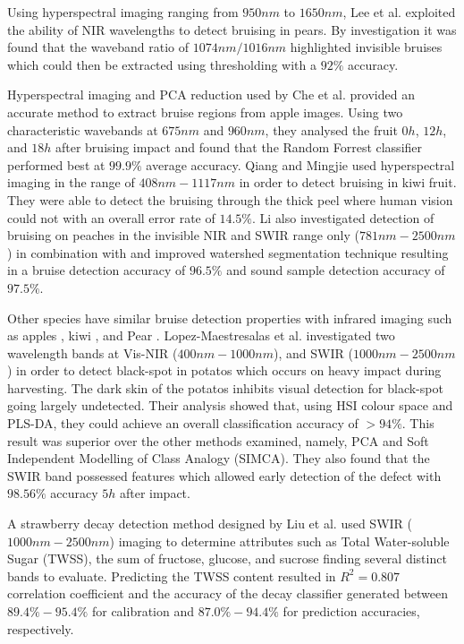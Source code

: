 \documentclass[fleqn,twoside,12pt]{report}
\begin{document}
Using hyperspectral imaging ranging from $950nm$ to $1650nm$, Lee et al.\cite{Lee2} exploited the ability of NIR wavelengths to detect bruising in pears. By investigation it was found that the waveband ratio of $1074nm/1016nm$ highlighted invisible bruises which could then be extracted using thresholding with a $92\%$ accuracy. 

Hyperspectral imaging and PCA reduction used by Che et al.\cite{che} provided an accurate method to extract bruise regions from apple images. Using two characteristic wavebands at $675nm$ and $960 nm$, they analysed the fruit $0h$, $12h$, and $18h$ after bruising impact and found that the Random Forrest classifier performed best at $99.9\%$ average accuracy. Qiang and Mingjie \cite{qiang} used hyperspectral imaging  in the range of $408nm-1117nm$ in order to detect bruising in kiwi fruit. They were able to detect the bruising through the thick peel where human vision could not with an overall error rate of $14.5\%$. Li \cite{li3} also investigated detection of bruising on peaches in the invisible NIR and SWIR range only ($781nm-2500nm$) in combination with and improved watershed segmentation technique resulting in a bruise detection accuracy of $96.5\%$ and sound sample detection accuracy of $97.5\%$.

Other species have similar bruise detection properties with infrared imaging such as apples \cite{che}, kiwi \cite{qiang}, and Pear \cite{lee}. Lopez-Maestresalas et al.\cite{ainara} investigated two wavelength bands at Vis-NIR ($400nm-1000nm$), and SWIR ($1000nm-2500nm$) in order to detect black-spot in potatos which occurs on heavy impact during harvesting. The dark skin of the potatos inhibits visual detection for black-spot going largely undetected. Their analysis showed that, using HSI colour space and PLS-DA, they could achieve an overall classification accuracy of $>94\%$. This result was superior over the other methods examined, namely, PCA and Soft Independent Modelling of Class Analogy (SIMCA). They also found that the SWIR band possessed features which allowed early detection of the defect with $98.56\%$ accuracy $5h$ after impact.

A strawberry decay detection method designed by Liu et al.\cite{liu2} used SWIR ($1000nm-2500nm$) imaging to determine attributes such as Total Water-soluble Sugar (TWSS), the sum of fructose, glucose, and sucrose finding several distinct bands to evaluate. Predicting the TWSS content resulted in $R^2=0.807$ correlation coefficient and the accuracy of the decay classifier generated between $89.4\%-95.4\%$ for calibration and $87.0\%-94.4\%$ for prediction accuracies, respectively.
\end{document}
